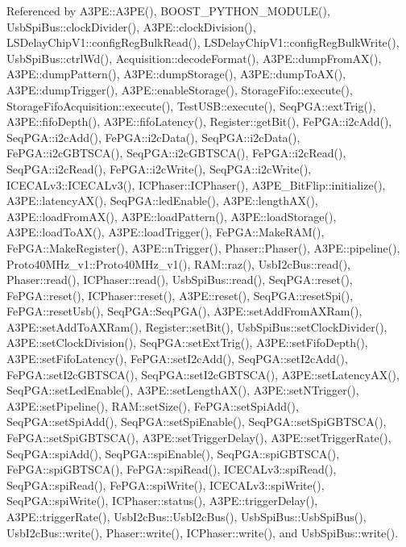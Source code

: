 Referenced by A3\+P\+E\+::\+A3\+P\+E(), B\+O\+O\+S\+T\+\_\+\+P\+Y\+T\+H\+O\+N\+\_\+\+M\+O\+D\+U\+L\+E(), Usb\+Spi\+Bus\+::clock\+Divider(), A3\+P\+E\+::clock\+Division(), L\+S\+Delay\+Chip\+V1\+::config\+Reg\+Bulk\+Read(), L\+S\+Delay\+Chip\+V1\+::config\+Reg\+Bulk\+Write(), Usb\+Spi\+Bus\+::ctrl\+Wd(), Acquisition\+::decode\+Format(), A3\+P\+E\+::dump\+From\+A\+X(), A3\+P\+E\+::dump\+Pattern(), A3\+P\+E\+::dump\+Storage(), A3\+P\+E\+::dump\+To\+A\+X(), A3\+P\+E\+::dump\+Trigger(), A3\+P\+E\+::enable\+Storage(), Storage\+Fifo\+::execute(), Storage\+Fifo\+Acquisition\+::execute(), Test\+U\+S\+B\+::execute(), Seq\+P\+G\+A\+::ext\+Trig(), A3\+P\+E\+::fifo\+Depth(), A3\+P\+E\+::fifo\+Latency(), Register\+::get\+Bit(), Fe\+P\+G\+A\+::i2c\+Add(), Seq\+P\+G\+A\+::i2c\+Add(), Fe\+P\+G\+A\+::i2c\+Data(), Seq\+P\+G\+A\+::i2c\+Data(), Fe\+P\+G\+A\+::i2c\+G\+B\+T\+S\+C\+A(), Seq\+P\+G\+A\+::i2c\+G\+B\+T\+S\+C\+A(), Fe\+P\+G\+A\+::i2c\+Read(), Seq\+P\+G\+A\+::i2c\+Read(), Fe\+P\+G\+A\+::i2c\+Write(), Seq\+P\+G\+A\+::i2c\+Write(), I\+C\+E\+C\+A\+Lv3\+::\+I\+C\+E\+C\+A\+Lv3(), I\+C\+Phaser\+::\+I\+C\+Phaser(), A3\+P\+E\+\_\+\+Bit\+Flip\+::initialize(), A3\+P\+E\+::latency\+A\+X(), Seq\+P\+G\+A\+::led\+Enable(), A3\+P\+E\+::length\+A\+X(), A3\+P\+E\+::load\+From\+A\+X(), A3\+P\+E\+::load\+Pattern(), A3\+P\+E\+::load\+Storage(), A3\+P\+E\+::load\+To\+A\+X(), A3\+P\+E\+::load\+Trigger(), Fe\+P\+G\+A\+::\+Make\+R\+A\+M(), Fe\+P\+G\+A\+::\+Make\+Register(), A3\+P\+E\+::n\+Trigger(), Phaser\+::\+Phaser(), A3\+P\+E\+::pipeline(), Proto40\+M\+Hz\+\_\+v1\+::\+Proto40\+M\+Hz\+\_\+v1(), R\+A\+M\+::raz(), Usb\+I2c\+Bus\+::read(), Phaser\+::read(), I\+C\+Phaser\+::read(), Usb\+Spi\+Bus\+::read(), Seq\+P\+G\+A\+::reset(), Fe\+P\+G\+A\+::reset(), I\+C\+Phaser\+::reset(), A3\+P\+E\+::reset(), Seq\+P\+G\+A\+::reset\+Spi(), Fe\+P\+G\+A\+::reset\+Usb(), Seq\+P\+G\+A\+::\+Seq\+P\+G\+A(), A3\+P\+E\+::set\+Add\+From\+A\+X\+Ram(), A3\+P\+E\+::set\+Add\+To\+A\+X\+Ram(), Register\+::set\+Bit(), Usb\+Spi\+Bus\+::set\+Clock\+Divider(), A3\+P\+E\+::set\+Clock\+Division(), Seq\+P\+G\+A\+::set\+Ext\+Trig(), A3\+P\+E\+::set\+Fifo\+Depth(), A3\+P\+E\+::set\+Fifo\+Latency(), Fe\+P\+G\+A\+::set\+I2c\+Add(), Seq\+P\+G\+A\+::set\+I2c\+Add(), Fe\+P\+G\+A\+::set\+I2c\+G\+B\+T\+S\+C\+A(), Seq\+P\+G\+A\+::set\+I2c\+G\+B\+T\+S\+C\+A(), A3\+P\+E\+::set\+Latency\+A\+X(), Seq\+P\+G\+A\+::set\+Led\+Enable(), A3\+P\+E\+::set\+Length\+A\+X(), A3\+P\+E\+::set\+N\+Trigger(), A3\+P\+E\+::set\+Pipeline(), R\+A\+M\+::set\+Size(), Fe\+P\+G\+A\+::set\+Spi\+Add(), Seq\+P\+G\+A\+::set\+Spi\+Add(), Seq\+P\+G\+A\+::set\+Spi\+Enable(), Seq\+P\+G\+A\+::set\+Spi\+G\+B\+T\+S\+C\+A(), Fe\+P\+G\+A\+::set\+Spi\+G\+B\+T\+S\+C\+A(), A3\+P\+E\+::set\+Trigger\+Delay(), A3\+P\+E\+::set\+Trigger\+Rate(), Seq\+P\+G\+A\+::spi\+Add(), Seq\+P\+G\+A\+::spi\+Enable(), Seq\+P\+G\+A\+::spi\+G\+B\+T\+S\+C\+A(), Fe\+P\+G\+A\+::spi\+G\+B\+T\+S\+C\+A(), Fe\+P\+G\+A\+::spi\+Read(), I\+C\+E\+C\+A\+Lv3\+::spi\+Read(), Seq\+P\+G\+A\+::spi\+Read(), Fe\+P\+G\+A\+::spi\+Write(), I\+C\+E\+C\+A\+Lv3\+::spi\+Write(), Seq\+P\+G\+A\+::spi\+Write(), I\+C\+Phaser\+::status(), A3\+P\+E\+::trigger\+Delay(), A3\+P\+E\+::trigger\+Rate(), Usb\+I2c\+Bus\+::\+Usb\+I2c\+Bus(), Usb\+Spi\+Bus\+::\+Usb\+Spi\+Bus(), Usb\+I2c\+Bus\+::write(), Phaser\+::write(), I\+C\+Phaser\+::write(), and Usb\+Spi\+Bus\+::write().


